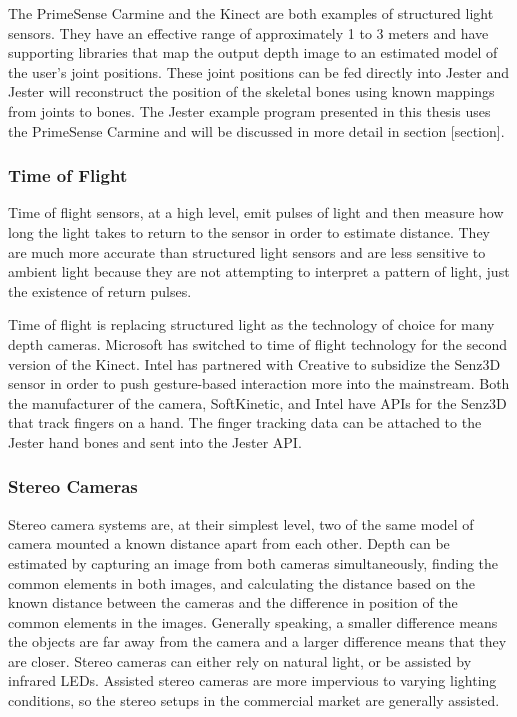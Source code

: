 The PrimeSense Carmine and the Kinect are both examples of structured light sensors. They have an effective range of approximately 1 to 3 meters and have supporting libraries that map the output depth image to an estimated model of the user’s joint positions. These joint positions can be fed directly into Jester and Jester will reconstruct the position of the skeletal bones using known mappings from joints to bones. The Jester example program presented in this thesis uses the PrimeSense Carmine and will be discussed in more detail in section [section].

\subsubsection{Time of Flight}

Time of flight sensors, at a high level, emit pulses of light and then measure how long the light takes to return to the sensor in order to estimate distance. They are much more accurate than structured light sensors and are less sensitive to ambient light because they are not attempting to interpret a pattern of light, just the existence of return pulses. 

Time of flight is replacing structured light as the technology of choice for many depth cameras. Microsoft has switched to time of flight technology for the second version of the Kinect. Intel has partnered with Creative to subsidize the Senz3D sensor in order to push gesture-based interaction more into the mainstream. Both the manufacturer of the camera, SoftKinetic, and Intel have APIs for the Senz3D that track fingers on a hand. The finger tracking data can be attached to the Jester hand bones and sent into the Jester API.

\subsubsection{Stereo Cameras}

Stereo camera systems are, at their simplest level, two of the same model of camera mounted a known distance apart from each other. Depth can be estimated by capturing an image from both cameras simultaneously, finding the common elements in both images, and calculating the distance based on the known distance between the cameras and the difference in position of the common elements in the images. Generally speaking, a smaller difference means the objects are far away from the camera and a larger difference means that they are closer. Stereo cameras can either rely on natural light, or be assisted by infrared LEDs. Assisted stereo cameras are more impervious to varying lighting conditions, so the stereo setups in the commercial market are generally assisted.


